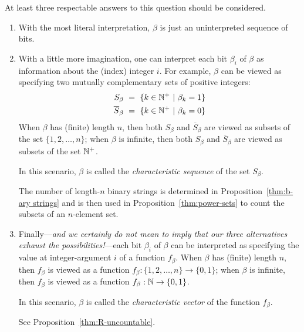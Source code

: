 \noindent
At least three respectable answers to this question should be considered.
\begin{enumerate}
\item
With the most literal interpretation, $\beta$ is just an uninterpreted sequence of bits.

\item
With a little more imagination, one can interpret each bit $\beta_i$ of $\beta$ as information about the (index) integer $i$.  For example, $\beta$ can be viewed as specifying two mutually complementary sets of positive integers:
\begin{eqnarray*}
S_\beta \ = \ \{ k \in \mathbb{N}^+ \ | \ \beta_k = 1\} \\
\overline{S}_\beta \ = \ \{ k \in \mathbb{N}^+ \ | \ \beta_k = 0\}
\end{eqnarray*}
When $\beta$ has (finite) length $n$, then both $S_\beta$ and $\overline{S}_\beta$ are viewed as subsets of the set $\{1, 2, \ldots, n\}$; when $\beta$ is infinite, then both $S_\beta$ and $\overline{S}_\beta$ are viewed as subsets of the set $\mathbb{N}^+$.

\smallskip

In this scenario, $\beta$ is called the {\it characteristic sequence} of the set $S_\beta$.

\medskip


\smallskip

The number of length-$n$ binary strings is determined in Proposition~\ref{thm:b-ary strings} and is then used in Proposition~\ref{thm:power-sets} to count the subsets of an $n$-element set.

\item
Finally---{\em and we certainly do not mean to imply that our three alternatives exhaust the possibilities!}---each bit $\beta_i$ of $\beta$ can be interpreted as specifying the value at integer-argument $i$ of a function $f_\beta$.  When $\beta$ has (finite) length $n$, then $f_\beta$ is viewed as a function $f_\beta: \{1, 2, \ldots, n\} \rightarrow \{0,1\}$; when $\beta$ is infinite, then $f_\beta$ is viewed as a function $f_\beta: \mathbb{N} \rightarrow \{0,1\}$.

\smallskip

In this scenario, $\beta$ is called the {\it characteristic vector} of the function $f_\beta$.

\medskip

  See Proposition~\ref{thm:R-uncountable}.
\end{enumerate}

